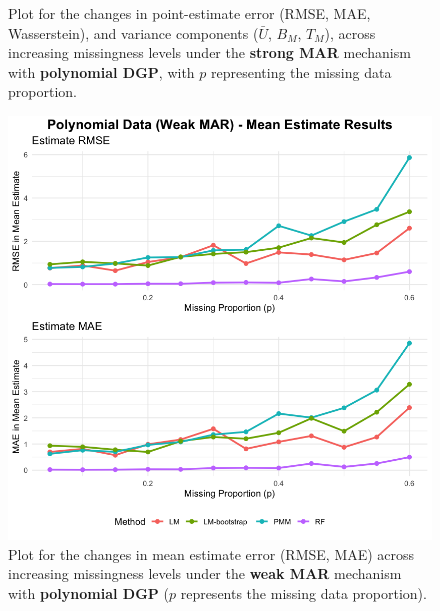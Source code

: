 \documentclass[12pt,oneside]{amsart}
\theoremstyle{definition}
\theoremstyle{remark}
\numberwithin{equation}{section}
\begin{document}
\begin{figure}[ht]
\begin{minipage}[b]{0.48\linewidth}
        \caption{Plot for the changes in point-estimate error (RMSE, MAE, Wasserstein), and variance components ($\bar{U}$, $B_M$, $T_M$), across increasing missingness levels under the \textbf{strong MAR} mechanism with \textbf{polynomial DGP}, with $p$ representing the missing data proportion.}
        \label{fig:result_poly_mar}
    \end{minipage}
\end{figure}

\begin{figure}[ht]
    \centering
    \begin{minipage}[b]{0.48\linewidth}
        \centering
        \includegraphics[width=\linewidth]{Report/Figure/mean_poly_wmar.jpg}
        \caption{Plot for the changes in mean estimate error (RMSE, MAE) across increasing missingness levels under the \textbf{weak MAR} mechanism with \textbf{polynomial DGP} ($p$ represents the missing data proportion).}
        \label{fig:mean_poly_wmar}
    \end{minipage}
    \hfill
    \begin{minipage}[b]{0.48\linewidth}
        \centering

\end{minipage}
\end{figure}
\end{document}
